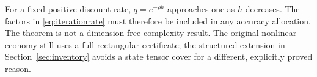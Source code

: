 For a fixed positive discount rate, $q=e^{-\rho h}$ approaches one as $h$ decreases. The factors in \eqref{eq:iterationrate} must therefore be included in any accuracy allocation. The theorem is not a dimension-free complexity result. The original nonlinear economy still uses a full rectangular certificate; the structured extension in Section~\ref{sec:inventory} avoids a state tensor cover for a different, explicitly proved reason.
